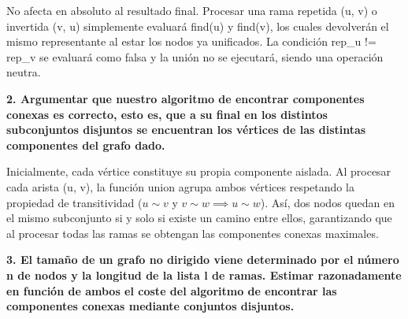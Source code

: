 \documentclass{article}
\begin{document}
\begin{enumerate}

    No afecta en absoluto al resultado final. Procesar una rama repetida (u, v) o invertida (v, u) simplemente evaluará find(u) y find(v), los cuales devolverán el mismo representante al estar los nodos ya unificados. La condición rep\_u != rep\_v se evaluará como falsa y la unión no se ejecutará, siendo una operación neutra.
    
\end{enumerate}

\vspace{0.5cm}

\item \textbf {2. Argumentar que nuestro algoritmo de encontrar componentes conexas es correcto, esto es, que a su final en los distintos subconjuntos disjuntos se encuentran los vértices de las distintas componentes del grafo dado.}

\vspace{0.3cm}

\begin{enumerate}

     Inicialmente, cada vértice constituye su propia componente aislada. Al procesar cada arista (u, v), la función union agrupa ambos vértices respetando la propiedad de transitividad ($u \sim v$ y $v \sim w \implies u \sim w$). Así, dos nodos quedan en el mismo subconjunto si y solo si existe un camino entre ellos, garantizando que al procesar todas las ramas se obtengan las componentes conexas maximales.
    
\end{enumerate}

\vspace{0.5cm}

\item \textbf{3. El tamaño de un grafo no dirigido viene determinado por el número n de nodos y la longitud de la lista l de ramas. Estimar razonadamente en función de ambos el coste del algoritmo de encontrar las componentes conexas mediante conjuntos disjuntos.}

\vspace{0.3cm}
\end{document}
